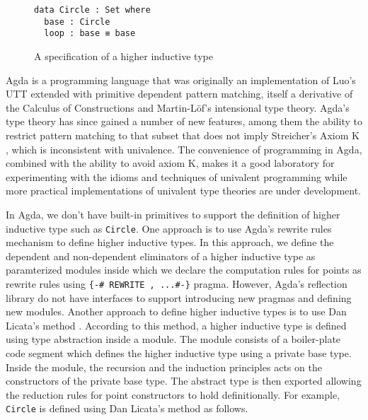 \documentclass[sigplan,10pt]{acmart}
\begin{document}
\begin{figure}[h]
\begin{center}
\begingroup
\begin{BVerbatim}
data Circle : Set where
  base : Circle
  loop : base ≡ base
\end{BVerbatim}
\endgroup
\end{center}

\caption{A specification of a higher inductive type}
\label{fig:circle}
\end{figure}
\normalsize


Agda  is a programming language that was originally an implementation of Luo's UTT  extended with primitive dependent pattern matching, itself a derivative of the Calculus of Constructions and Martin-Löf's intensional type theory.
Agda's type theory has since gained a number of new features, among them the ability to restrict pattern matching to that subset that does not imply Streicher's Axiom K , which is inconsistent with univalence.
The convenience of programming in Agda, combined with the ability to avoid axiom K, makes it a good laboratory for experimenting with the idioms and techniques of univalent programming while more practical implementations of univalent type theories are under development.



In Agda, we don't have built-in primitives to support the definition of higher inductive type such as {\tt Circle}. One approach is to use Agda's rewrite rules  mechanism to define higher inductive types. In this approach, we define the dependent and non-dependent eliminators of a higher inductive type as paramterized modules inside which we declare the computation rules for points as rewrite rules using \Verb|{-# REWRITE , ...#-}| pragma. However, Agda's reflection library do not have interfaces to support introducing new pragmas and defining new modules. Another approach to define higher inductive types is to use Dan Licata's method \cite{Licata-2011}. According to this method, a higher inductive type is defined using type abstraction inside a module. The module consists of a boiler-plate code segment which defines the higher inductive type using a private base type. Inside the module, the recursion and the induction principles acts on the constructors of the private base type. The abstract type is then exported allowing the reduction rules for point constructors to hold definitionally. For example, {\tt Circle} is defined using Dan Licata's method as follows.
\end{document}
